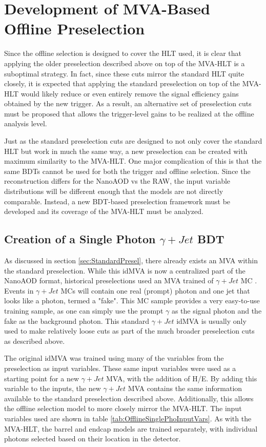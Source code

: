\documentclass[12pt]{ucsddissertation}
\begin{document}
\section{Development of MVA-Based Offline Preselection}
Since the offline selection is designed to cover the HLT used, it is clear that applying the older preselection described above on top of the MVA-HLT is a suboptimal strategy. In fact, since these cuts mirror the standard HLT quite closely, it is expected that applying the standard preselection on top of the MVA-HLT would likely reduce or even entirely remove the signal efficiency gains obtained by the new trigger. As a result, an alternative set of preselection cuts must be proposed that allows the trigger-level gains to be realized at the offline analysis level. 

Just as the standard preselection cuts are designed to not only cover the standard HLT but work in much the same way, a new preselection can be created with maximum similarity to the MVA-HLT. One major complication of this is that the same BDTs cannot be used for both the trigger and offline selection. Since the reconstruction differs for the NanoAOD vs the RAW, the input variable distributions will be different enough that the models are not directly comparable. Instead, a new BDT-based preselection framework must be developed and its coverage of the MVA-HLT must be analyzed.
\subsection{Creation of a Single Photon $\gamma + Jet$ BDT}
As discussed in section \ref{sec:StandardPresel}, there already exists an MVA within the standard preselection. While this idMVA is now a centralized part of the NanoAOD format, historical preselections used an MVA trained of $\gamma + Jet$ MC \cite{Run2Hgg2018}. Events in $\gamma + Jet$ MCs will contain one real (prompt) photon and one jet that looks like a photon, termed a "fake". This MC sample provides a very easy-to-use training sample, as one can simply use the prompt $\gamma$ as the signal photon and the fake as the background photon. This standard $\gamma + Jet$ idMVA is usually only used to make relatively loose cuts as part of the much broader preselection cuts as described above. 

The original idMVA was trained using many of the variables from the preselection as input variables. These same input variables were used as a starting point for a new $\gamma + Jet$ MVA, with the addition of H/E. By adding this variable to the inputs, the new $\gamma + Jet$ MVA contains the same information available to the standard preselection described above. Additionally, this allows the offline selection model to more closely mirror the MVA-HLT. The input variables used are shown in table \ref{tab:OfflineSinglePhoInputVars}. As with the MVA-HLT, the barrel and endcap models are trained separately, with individual photons selected based on their location in the detector.
\end{document}

